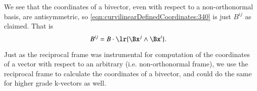 We see that the coordinates of a bivector, even with respect to a non-orthonormal basis, are antisymmetric, so
\cref{eqn:curvilinearDefinedCoordinates:340} is just \( B^{ij} \) as claimed.  That is
\begin{dmath}\label{eqn:curvilinearDefinedCoordinates:401}
B^{ij} = B \cdot \lr{ \Bx^{j} \wedge \Bx^{i} }.
\end{dmath}

Just as the reciprocal frame was instrumental for computation of the coordinates of a vector with respect to an arbitrary (i.e. non-orthonormal frame), we use the reciprocal frame to calculate the coordinates of a bivector, and could do the same for higher grade k-vectors as well.
